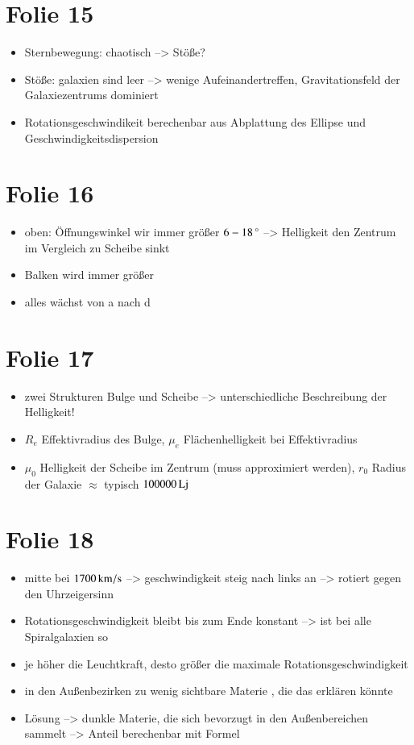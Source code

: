 \section{Folie 15}

\begin{itemize}
\item Sternbewegung: chaotisch --> Stöße?
\item Stöße: galaxien sind leer --> wenige Aufeinandertreffen, Gravitationsfeld der Galaxiezentrums dominiert
\item Rotationsgeschwindikeit berechenbar aus Abplattung des Ellipse und Geschwindigkeitsdispersion
\end{itemize}



\section{Folie 16}

\begin{itemize}
\item oben: Öffnungswinkel wir immer größer $\unit[6-18]{^\circ}$ --> Helligkeit den Zentrum im Vergleich zu Scheibe sinkt
\item Balken wird immer größer 
\item alles wächst von a nach d
\end{itemize}



\section{Folie 17}

\begin{itemize}
\item zwei Strukturen Bulge und Scheibe --> unterschiedliche Beschreibung der Helligkeit!
\item $R_e$ Effektivradius des Bulge, $\mu_e$ Flächenhelligkeit bei Effektivradius
\item $\mu_0$ Helligkeit der Scheibe im Zentrum (muss approximiert werden), $r_0$ Radius der Galaxie $\approx$ typisch $\unit[100000]{Lj}$
\end{itemize}


\section{Folie 18}

\begin{itemize}
\item mitte bei $\unit[1700]{km/s}$ --> geschwindigkeit steig nach links an --> rotiert gegen den Uhrzeigersinn
\item Rotationsgeschwindigkeit bleibt bis zum Ende konstant --> ist bei alle Spiralgalaxien so
\item je höher die Leuchtkraft, desto größer die maximale Rotationsgeschwindigkeit
\item in den Außenbezirken zu wenig sichtbare Materie , die das erklären könnte
\item Lösung --> dunkle Materie, die sich bevorzugt in den Außenbereichen sammelt --> Anteil berechenbar mit Formel
\end{itemize}


